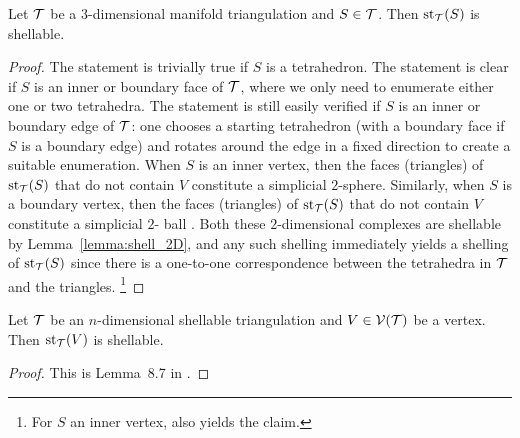 \documentclass[10pt,a4paper]{article}
\newcommand\cye[1]{%
\protect\leavevmode
\begingroup
    \color{blue}%
    #1%
\endgroup
}
\newcommand{\disk}{\cye{ball}}
\begin{document}
\begin{lemma}
    Let ${\mathcal T}$ be a $3$-dimensional manifold triangulation and $S \in {\mathcal T}$.
    Then $\operatorname{st}_{{\mathcal T}}(S)$ is shellable. 
\end{lemma}
\begin{proof}
    The statement is trivially true if $S$ is a tetrahedron. 
    The statement is clear if $S$ is an inner or boundary face of ${\mathcal T}$,
    where we only need to enumerate either one or two tetrahedra. 
    The statement is still easily verified if $S$ is an inner or boundary edge of ${\mathcal T}$:
    one chooses a starting tetrahedron (with a boundary face if $S$ is a boundary edge) and rotates around the edge in a fixed direction to create a suitable enumeration. 
    When $S$ is an inner vertex, then the faces (triangles) of $\operatorname{st}_{{\mathcal T}}(S)$ that do not contain $V$ constitute a simplicial $2$-sphere.
    Similarly, when $S$ is a boundary vertex, then the faces (triangles) of $\operatorname{st}_{{\mathcal T}}(S)$ that do not contain $V$ constitute a simplicial $2$-\disk.
    Both these $2$-dimensional complexes are shellable by Lemma~\ref{lemma:shell_2D}, and any such shelling immediately yields a shelling of $\operatorname{st}_{{\mathcal T}}(S)$ since there is a one-to-one correspondence between the tetrahedra in ${\mathcal T}$ and the triangles.
    \footnote{For $S$ an inner vertex, \cite[Lemma~B.1]{ern2020stable} also yields the claim.}
\end{proof}


\begin{lemma}\label{lemma:stars_are_shellable}
    Let ${\mathcal T}$ be an $n$-dimensional shellable triangulation and $V \in {\mathcal V}({\mathcal T})$ be a vertex.
    Then $\operatorname{st}_{{\mathcal T}}(V)$ is shellable. 
\end{lemma}
\begin{proof}
    This is Lemma~8.7 in \cite{ziegler1995lectures}.
\end{proof}
\end{document}

